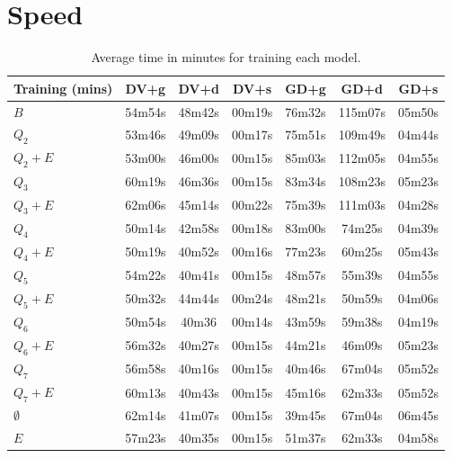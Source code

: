 \section{Speed}

\begin{table}[h]
  \centering
  \begin{tabular}{l|c|c|c|c|c|c}
    \hline
    \multicolumn{1}{c}{\bfseries Training (mins)} & \multicolumn{1}{c}{\bfseries DV+g} &
    \multicolumn{1}{c}{\bfseries DV+d} & \multicolumn{1}{c}{\bfseries DV+s} &
    \multicolumn{1}{c}{\bfseries GD+g} & \multicolumn{1}{c}{\bfseries GD+d} &
    \multicolumn{1}{c}{\bfseries GD+s}\\
    \hline
    $B$         & 54m54s & 48m42s & 00m19s & 76m32s & 115m07s& 05m50s\\
    $Q_2$       & 53m46s & 49m09s & 00m17s & 75m51s & 109m49s& 04m44s\\
    $Q_2+E$     & 53m00s & 46m00s & 00m15s & 85m03s & 112m05s& 04m55s\\
    $Q_3$       & 60m19s & 46m36s & 00m15s & 83m34s & 108m23s& 05m23s\\
    $Q_3+E$     & 62m06s & 45m14s & 00m22s & 75m39s & 111m03s& 04m28s\\
    $Q_4$       & 50m14s & 42m58s & 00m18s & 83m00s & 74m25s & 04m39s\\
    $Q_4+E$     & 50m19s & 40m52s & 00m16s & 77m23s & 60m25s & 05m43s\\
    $Q_5$       & 54m22s & 40m41s & 00m15s & 48m57s & 55m39s & 04m55s\\
    $Q_5+E$     & 50m32s & 44m44s & 00m24s & 48m21s & 50m59s & 04m06s\\
    $Q_6$       & 50m54s & 40m36  & 00m14s & 43m59s & 59m38s & 04m19s\\
    $Q_6+E$     & 56m32s & 40m27s & 00m15s & 44m21s & 46m09s & 05m23s\\
    $Q_7$       & 56m58s & 40m16s & 00m15s & 40m46s & 67m04s & 05m52s\\
    $Q_7+E$     & 60m13s & 40m43s & 00m15s & 45m16s & 62m33s & 05m52s\\
    $\emptyset$ & 62m14s & 41m07s & 00m15s & 39m45s & 67m04s & 06m45s\\
    $E$         & 57m23s & 40m35s & 00m15s & 51m37s & 62m33s & 04m58s\\
  \end{tabular}
  \caption{Average time in minutes for training each model.\label{tab:time-training}}
\end{table}

